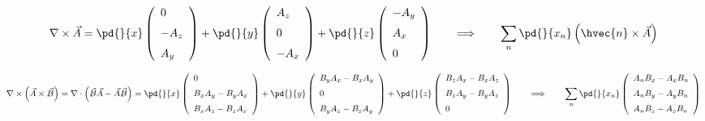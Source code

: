 \documentclass{article}
\begin{document}
\[
     \nabla\times\vec{A} =
     \pd{}{x}\left(\begin{array}{l}
        0  \\ \noalign{\medskip}
       -A_z \\ \noalign{\medskip}
        A_y
     \end{array}\right)
     +
     \pd{}{y}\left(\begin{array}{l}
       A_z \\ \noalign{\medskip}
       0   \\ \noalign{\medskip}
       -A_x
     \end{array}\right)
     +
     \pd{}{z}\left(\begin{array}{l}
       -A_y\\ \noalign{\medskip}
        A_x \\ \noalign{\medskip}
        0
     \end{array}\right)
     \qquad\Longrightarrow\qquad
     \sum_n\pd{}{x_n} \left(\hvec{n}\times\vec{A}\right)
   \]
\pagebreak

\[
      \nabla\times\left(\vec{A}\times\vec{B}\right) =
      \nabla\cdot \left(\vec{B}\vec{A} - \vec{A}\vec{B}\right) =
     \pd{}{x}\left(\begin{array}{l}
       0      \\ \noalign{\medskip}
       B_xA_y - B_yA_x \\ \noalign{\medskip}
       B_xA_z - B_zA_x
     \end{array}\right)
     +
     \pd{}{y}\left(\begin{array}{l}
       B_yA_x - B_xA_y \\ \noalign{\medskip}
       0               \\ \noalign{\medskip}
       B_yA_z - B_zA_y
     \end{array}\right)
     +
     \pd{}{z}\left(\begin{array}{l}
       B_zA_x - B_xA_z \\ \noalign{\medskip}
       B_zA_y - B_yA_z\\ \noalign{\medskip}
       0 
     \end{array}\right)
     \qquad\Longrightarrow\qquad
     \sum_n\pd{}{x_n}\left(\begin{array}{l}
       A_nB_x - A_xB_n\\ \noalign{\medskip}
       A_nB_y - A_yB_n\\ \noalign{\medskip}
       A_nB_z - A_zB_n
     \end{array}\right)
   \]
\pagebreak
\end{document}
